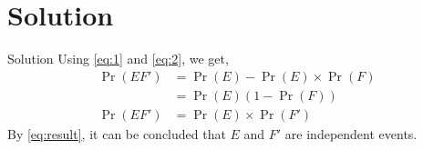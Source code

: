 \documentclass{beamer}
\providecommand{\pr}[1]{\ensuremath{\Pr\left(#1\right)}}
\providecommand{\brak}[1]{\ensuremath{\left(#1\right)}}
\begin{document}
\section{Solution}
\begin{frame}{Solution}
    Using \eqref{eq:1} and \eqref{eq:2}, we get,
    \begin{align}
        \pr{EF'} & = \pr{E} - \pr{E} \times \pr{F}
        \\
                 & = \pr{E}\brak{1 - \pr{F}}
        \\
        \label{eq:result}
        \pr{EF'} & = \pr{E} \times \pr{F'}
    \end{align}
    By \eqref{eq:result}, it can be concluded that $E$ and $F'$ are independent events.
\end{frame}
\end{document}
